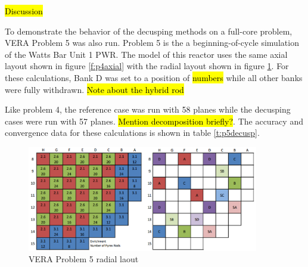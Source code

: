 \begin{table}
\centering
\caption{VERA Problem 4 Decusping Results}\label{t:p4decusp}
\end{table}

\hl{Discussion}

To demonstrate the behavior of the decusping methods on a full-core problem, VERA Problem 5 was also run.  Problem 5 is the a beginning-of-cycle simulation of the Watts Bar Unit 1 PWR.  The model of this reactor uses the same axial layout shown in figure \ref{f:p4axial} with the radial layout shown in figure \ref{f:p5radial}.  For these calculations, Bank D was set to a position of \hl{numbers} while all other banks were fully withdrawn.  \hl{Note about the hybrid rod}

Like problem 4, the reference case was run with 58 planes while the decusping cases were run with 57 planes.  \hl{Mention decomposition briefly?}.  The accuracy and convergence data for these calculations is shown in table \ref{t:p5decusp}.

\begin{figure}
\centering
\includegraphics[width=0.9\textwidth]{figs/WB1-cycle1-layout.png}
\caption{VERA Problem 5 radial laout}\label{f:p5radial}
\end{figure}

